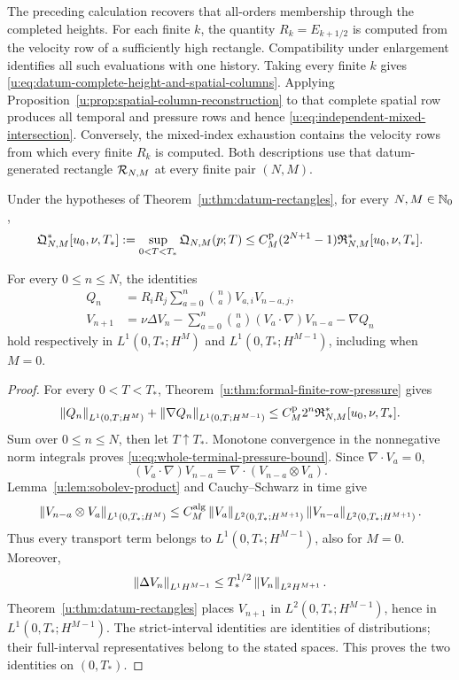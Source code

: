 The preceding calculation recovers that all-orders membership through the
completed heights.  For each finite \(k\), the quantity
\(R_k=E_{k+1/2}\) is computed from the velocity row of a sufficiently high
rectangle.  Compatibility under enlargement identifies all such evaluations
with one history.  Taking every finite \(k\) gives
\eqref{u:eq:datum-complete-height-and-spatial-columns}.  Applying
Proposition~\ref{u:prop:spatial-column-reconstruction} to that complete spatial
row produces all temporal and pressure rows and hence
\eqref{u:eq:independent-mixed-intersection}.  Conversely, the
mixed-index exhaustion contains the velocity rows from which every finite
\(R_k\) is computed.  Both descriptions use that
datum-generated rectangle \(\mathcal R_{N,M}\) at every finite pair \((N,M)\).

\begin{proposition}
\label{u:prop:rectangle-pressure-completion}
Under the hypotheses of Theorem~\ref{u:thm:datum-rectangles}, for every
\(N,M\in\mathbb N_0\),
\begin{equation}
 \mathfrak Q_{N,M}^*[u_0,\nu,T_*]
 :=\sup_{0<T<T_*}\mathfrak Q_{N,M}(p;T)
 \le
 C_M^{\rm p}(2^{N+1}-1)\mathfrak R_{N,M}^*[u_0,\nu,T_*].
 \label{u:eq:whole-terminal-pressure-bound}
\end{equation}
\begin{samepage}
For every \(0\le n\le N\), the identities
\begin{align}
 Q_n
 &=R_iR_j\sum_{a=0}^n\binom naV_{a,i}V_{n-a,j},
 \label{u:eq:rectangle-pressure-identity}\\
 V_{n+1}
 &=\nu\Delta V_n
 -\sum_{a=0}^n\binom na(V_a\cdot\nabla)V_{n-a}-\nabla Q_n
 \label{u:eq:rectangle-velocity-identity}
\end{align}
hold respectively in
\(L^1(0,T_*;H^M)\) and \(L^1(0,T_*;H^{M-1})\), including when
\(M=0\).
\end{samepage}
\end{proposition}

\begin{proof}
For every \(0<T<T_*\),
Theorem~\ref{u:thm:formal-finite-row-pressure} gives
\[
 \left\lVert Q_n\right\rVert_{L^1(0,T;H^M)}
 +\left\lVert \nabla Q_n\right\rVert_{L^1(0,T;H^{M-1})}
 \le C_M^{\rm p}2^n\mathfrak R_{N,M}^*[u_0,\nu,T_*].
\]
Sum over \(0\le n\le N\), then let \(T\uparrow T_*\).  Monotone
convergence in the nonnegative norm integrals proves
\eqref{u:eq:whole-terminal-pressure-bound}.  Since
\(\nabla\cdot V_a=0\),
\[
 (V_a\cdot\nabla)V_{n-a}
 =\nabla\cdot(V_{n-a}\otimes V_a).
\]
Lemma~\ref{u:lem:sobolev-product} and Cauchy--Schwarz in time give
\[
 \left\lVert V_{n-a}\otimes V_a\right\rVert_{L^1(0,T_*;H^M)}
 \le C_M^{\rm alg}
 \left\lVert V_a\right\rVert_{L^2(0,T_*;H^{M+1})}
 \left\lVert V_{n-a}\right\rVert_{L^2(0,T_*;H^{M+1})}.
\]
Thus every transport term belongs to
\(L^1(0,T_*;H^{M-1})\), also for \(M=0\).  Moreover,
\[
 \left\lVert \Delta V_n\right\rVert_{L^1H^{M-1}}
 \le T_*^{1/2}\left\lVert V_n\right\rVert_{L^2H^{M+1}}.
\]
Theorem~\ref{u:thm:datum-rectangles} places \(V_{n+1}\) in
\(L^2(0,T_*;H^{M-1})\), hence in \(L^1(0,T_*;H^{M-1})\).
The strict-interval identities are identities of distributions; their
full-interval representatives belong to the stated spaces.  This proves the
two identities on \((0,T_*)\).
\end{proof}

